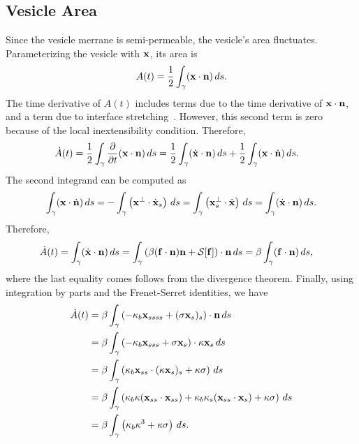 \documentclass[aps,prl,showpacs]{revtex4}
\begin{document}
\subsection{Vesicle Area}
Since the vesicle merrane is semi-permeable, the vesicle's area
fluctuates.  Parameterizing the vesicle with $\mathbf{x}$, its area is
\begin{align}
  A(t) = \frac{1}{2}\int_{\gamma} (\mathbf{x} \cdot \mathbf{n})\, ds .
\end{align}
The time derivative of $A(t)$ includes terms due to the time derivative
of $\mathbf{x} \cdot \mathbf{n}$, and a term due to interface
stretching~\cite{lai-tse-hua2008}. However, this second term is zero
because of the local inextensibility condition. Therefore, 
\begin{align}
  \dot{A}(t) &= \frac{1}{2} \int_{\gamma} \frac{\partial }{\partial t} 
    (\mathbf{x} \cdot \mathbf{n}) \, ds = 
  \frac{1}{2} \int_{\gamma} (\dot{\mathbf{x}} \cdot \mathbf{n})\, ds  + 
  \frac{1}{2} \int_{\gamma} (\mathbf{x} \cdot \dot{\mathbf{n}})\, ds.
\end{align}
The second integrand can be computed as
\begin{align}
  \int_\gamma (\mathbf{x} \cdot \dot{\mathbf{n}})\, ds 
    = -\int_\gamma \left(\mathbf{x}^\perp \cdot \dot{\mathbf{x}}_s\right)\, ds 
    = \int_\gamma \left(\mathbf{x}_s^\perp \cdot \dot{\mathbf{x}}\right)\, ds 
    = \int_\gamma (\dot{\mathbf{x}} \cdot \mathbf{n})\, ds.
\end{align}
Therefore,
\begin{align}
  \dot{A}(t) &= \int_\gamma (\dot{\mathbf{x}} \cdot \mathbf{n})\, ds 
  = \int_\gamma \left(\beta (\mathbf{f} \cdot \mathbf{n})\mathbf{n} + \mathcal{S}[\mathbf{f}]\right) 
      \cdot \mathbf{n}\, ds 
  = \beta \int_\gamma (\mathbf{f} \cdot \mathbf{n})\, ds,
\end{align}
where the last equality comes follows from the divergence theorem.
Finally, using integration by parts and the Frenet-Serret identities, we
have
\begin{align*}
  \dot{A}(t) &= \beta \int_\gamma \left( -\kappa_b \mathbf{x}_{ssss} + 
    (\sigma \mathbf{x}_s)_s \right) \cdot \mathbf{n} \, ds \\
  &= \beta \int_\gamma \left(-\kappa_b \mathbf{x}_{sss} + \sigma \mathbf{x}_s 
    \right) \cdot \kappa \mathbf{x}_s \, ds \\
  &= \beta \int_\gamma \left(\kappa_b \mathbf{x}_{ss} \cdot 
    (\kappa \mathbf{x}_s)_s + \kappa \sigma \right) \, ds \\
  &= \beta \int_\gamma \left(\kappa_b \kappa (\mathbf{x}_{ss} \cdot \mathbf{x}_{ss}) + 
    \kappa_b \kappa_s (\mathbf{x}_{ss} \cdot \mathbf{x}_s) + \kappa \sigma \right) 
    \, ds \\
  &= \beta \int_\gamma \left(\kappa_b \kappa^3 + \kappa \sigma \right) 
    \, ds.
\end{align*}
\end{document}
